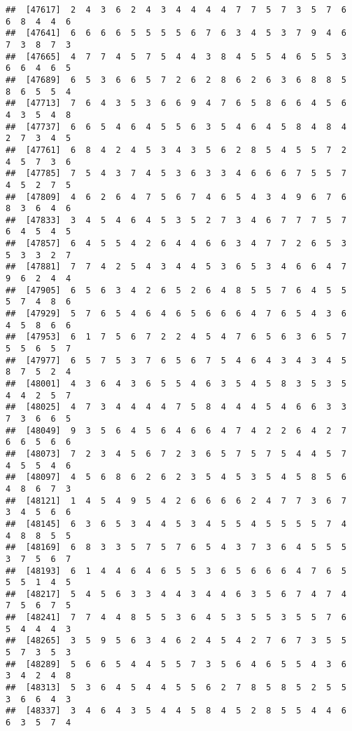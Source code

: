 \documentclass[
]{book}
\begin{document}
\begin{verbatim}
##  [47617]  2  4  3  6  2  4  3  4  4  4  4  7  7  5  7  3  5  7  6  6  8  4  4  6
##  [47641]  6  6  6  6  5  5  5  5  6  7  6  3  4  5  3  7  9  4  6  7  3  8  7  3
##  [47665]  4  7  7  4  5  7  5  4  4  3  8  4  5  5  4  6  5  5  3  6  6  4  6  5
##  [47689]  6  5  3  6  6  5  7  2  6  2  8  6  2  6  3  6  8  8  5  8  6  5  5  4
##  [47713]  7  6  4  3  5  3  6  6  9  4  7  6  5  8  6  6  4  5  6  4  3  5  4  8
##  [47737]  6  6  5  4  6  4  5  5  6  3  5  4  6  4  5  8  4  8  4  2  7  3  4  5
##  [47761]  6  8  4  2  4  5  3  4  3  5  6  2  8  5  4  5  5  7  2  4  5  7  3  6
##  [47785]  7  5  4  3  7  4  5  3  6  3  3  4  6  6  6  7  5  5  7  4  5  2  7  5
##  [47809]  4  6  2  6  4  7  5  6  7  4  6  5  4  3  4  9  6  7  6  8  3  6  4  6
##  [47833]  3  4  5  4  6  4  5  3  5  2  7  3  4  6  7  7  7  5  7  6  4  5  4  5
##  [47857]  6  4  5  5  4  2  6  4  4  6  6  3  4  7  7  2  6  5  3  5  3  3  2  7
##  [47881]  7  7  4  2  5  4  3  4  4  5  3  6  5  3  4  6  6  4  7  9  6  2  4  4
##  [47905]  6  5  6  3  4  2  6  5  2  6  4  8  5  5  7  6  4  5  5  5  7  4  8  6
##  [47929]  5  7  6  5  4  6  4  6  5  6  6  6  4  7  6  5  4  3  6  4  5  8  6  6
##  [47953]  6  1  7  5  6  7  2  2  4  5  4  7  6  5  6  3  6  5  7  5  5  6  5  7
##  [47977]  6  5  7  5  3  7  6  5  6  7  5  4  6  4  3  4  3  4  5  8  7  5  2  4
##  [48001]  4  3  6  4  3  6  5  5  4  6  3  5  4  5  8  3  5  3  5  4  4  2  5  7
##  [48025]  4  7  3  4  4  4  4  7  5  8  4  4  4  5  4  6  6  3  3  7  3  6  6  5
##  [48049]  9  3  5  6  4  5  6  4  6  6  4  7  4  2  2  6  4  2  7  6  6  5  6  6
##  [48073]  7  2  3  4  5  6  7  2  3  6  5  7  5  7  5  4  4  5  7  4  5  5  4  6
##  [48097]  4  5  6  8  6  2  6  2  3  5  4  5  3  5  4  5  8  5  6  4  8  6  7  3
##  [48121]  1  4  5  4  9  5  4  2  6  6  6  6  2  4  7  7  3  6  7  3  4  5  6  6
##  [48145]  6  3  6  5  3  4  4  5  3  4  5  5  4  5  5  5  5  7  4  4  8  8  5  5
##  [48169]  6  8  3  3  5  7  5  7  6  5  4  3  7  3  6  4  5  5  5  3  7  5  6  7
##  [48193]  6  1  4  4  6  4  6  5  5  3  6  5  6  6  6  4  7  6  5  5  5  1  4  5
##  [48217]  5  4  5  6  3  3  4  4  3  4  4  6  3  5  6  7  4  7  4  7  5  6  7  5
##  [48241]  7  7  4  4  8  5  5  3  6  4  5  3  5  5  3  5  5  7  6  5  4  4  4  3
##  [48265]  3  5  9  5  6  3  4  6  2  4  5  4  2  7  6  7  3  5  5  5  7  3  5  3
##  [48289]  5  6  6  5  4  4  5  5  7  3  5  6  4  6  5  5  4  3  6  3  4  2  4  8
##  [48313]  5  3  6  4  5  4  4  5  5  6  2  7  8  5  8  5  2  5  5  3  6  6  4  3
##  [48337]  3  4  6  4  3  5  4  4  5  8  4  5  2  8  5  5  4  4  6  6  3  5  7  4

\end{verbatim}
\end{document}
